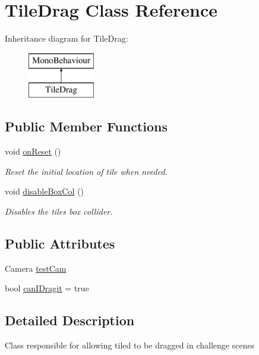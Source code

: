 \hypertarget{class_tile_drag}{}\section{Tile\+Drag Class Reference}
\label{class_tile_drag}
Inheritance diagram for Tile\+Drag\+:\begin{figure}[H]
\begin{center}
\leavevmode
\includegraphics[height=2.000000cm]{class_tile_drag}
\end{center}
\end{figure}
\subsection*{Public Member Functions}
\begin{DoxyCompactItemize}
\item 
void \hyperlink{class_tile_drag_a1e6de5920e24560c0e2dc78663d476de}{on\+Reset} ()
\begin{DoxyCompactList}\small\item\em Reset the initial location of tile when needed. \end{DoxyCompactList}\item 
void \hyperlink{class_tile_drag_a2ac05ed0439d4c9467aef8a0304d5432}{disable\+Box\+Col} ()
\begin{DoxyCompactList}\small\item\em Disables the tile\textquotesingle{}s box collider. \end{DoxyCompactList}\end{DoxyCompactItemize}
\subsection*{Public Attributes}
\begin{DoxyCompactItemize}
\item 
Camera \hyperlink{class_tile_drag_ade5547217c689f6d09d444bda707d1b3}{test\+Cam}
\item 
bool \hyperlink{class_tile_drag_a24edf4664b06aaffd113f728a57867e3}{can\+I\+Dragit} = true
\end{DoxyCompactItemize}


\subsection{Detailed Description}
Class responsible for allowing tiled to be dragged in challenge scenes 

